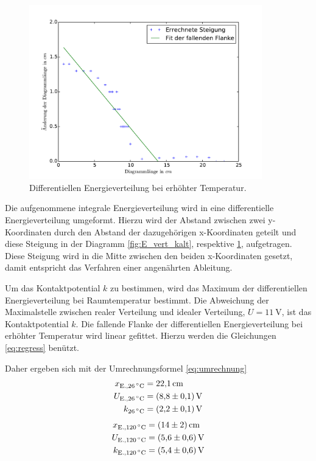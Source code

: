 \begin{figure}[p]
	\centering
	\includegraphics[width=0.9\textwidth]{Bilder/Vert_warm_diff.pdf}
	\caption{Differentiellen Energieverteilung bei erhöhter Temperatur.\cite{matplotlib}}
	\label{fig:E_vert_warm}
\end{figure}
Die aufgenommene integrale Energieverteilung wird in eine differentielle Energieverteilung umgeformt.
Hierzu wird der Abstand zwischen zwei y-Koordinaten durch den Abstand der dazugehörigen x-Koordinaten geteilt und diese Steigung in der Diagramm \ref{fig:E_vert_kalt}, respektive \ref{fig:E_vert_warm}, aufgetragen. 
Diese Steigung wird in die Mitte zwischen den beiden x-Koordinaten gesetzt, damit entspricht das Verfahren einer angenährten Ableitung.

Um das Kontaktpotential $k$ zu bestimmen, wird das Maximum der differentiellen Energieverteilung bei Raumtemperatur bestimmt.
Die Abweichung der Maximalstelle zwischen realer Verteilung und idealer Verteilung, $U=\SI{11}{\volt}$, ist das Kontaktpotential $k$.
Die fallende Flanke der differentiellen Energieverteilung bei erhöhter Temperatur wird linear gefittet.
Hierzu werden die Gleichungen \ref{eq:regress} benützt.

Daher ergeben sich mit der Umrechnungsformel \eqref{eq:umrechnung}
\begin{align}
	x_\text{E.,\SI{26}{\degreeCelsius}}&= \SI{22.1}{\centi\meter}\\
	U_\text{E.,\SI{26}{\degreeCelsius}}&= \SI{8.8(1)}{\volt}\\
	k_\text{\SI{26}{\degreeCelsius}} &= \SI{2.2(1)}{\volt}
	\label{qu:k1}
\end{align}
\begin{align}
	x_\text{E.,\SI{120}{\degreeCelsius}}&= \SI{14(2)}{\centi\meter}\\
	U_\text{E.,\SI{120}{\degreeCelsius}}&= \SI{5.6(6)}{\volt}\\
	k_\text{E.,\SI{120}{\degreeCelsius}}&= \SI{5.4(6)}{\volt}
\end{align}

